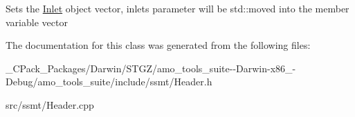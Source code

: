 Sets the \hyperlink{class_inlet}{Inlet} object vector, inlets parameter will be std\+::moved into the member variable vector 

The documentation for this class was generated from the following files\+:\begin{DoxyCompactItemize}
\item 
\+\_\+\+C\+Pack\+\_\+\+Packages/\+Darwin/\+S\+T\+G\+Z/amo\+\_\+tools\+\_\+suite-\/-\/\+Darwin-\/x86\+\_-\/\+Debug/amo\+\_\+tools\+\_\+suite/include/ssmt/Header.\+h\item 
src/ssmt/Header.\+cpp\end{DoxyCompactItemize}
